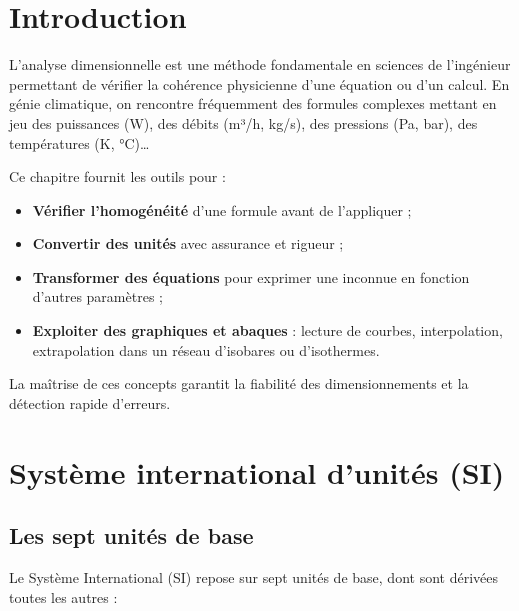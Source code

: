 \section{Introduction}

L'analyse dimensionnelle est une méthode fondamentale en sciences de l'ingénieur permettant
de vérifier la cohérence physicienne d'une équation ou d'un calcul. En génie climatique, on
rencontre fréquemment des formules complexes mettant en jeu des puissances (W), des débits
(m³/h, kg/s), des pressions (Pa, bar), des températures (K, °C)…

Ce chapitre fournit les outils pour :
\begin{itemize}
  \item \textbf{Vérifier l'homogénéité} d'une formule avant de l'appliquer ;
  \item \textbf{Convertir des unités} avec assurance et rigueur ;
  \item \textbf{Transformer des équations} pour exprimer une inconnue en fonction d'autres
        paramètres ;
  \item \textbf{Exploiter des graphiques et abaques} : lecture de courbes, interpolation,
        extrapolation dans un réseau d'isobares ou d'isothermes.
\end{itemize}

La maîtrise de ces concepts garantit la fiabilité des dimensionnements et la détection rapide
d'erreurs.

\section{Système international d'unités (SI)}

\subsection{Les sept unités de base}

Le Système International (SI) repose sur sept unités de base, dont sont dérivées toutes les
autres :

